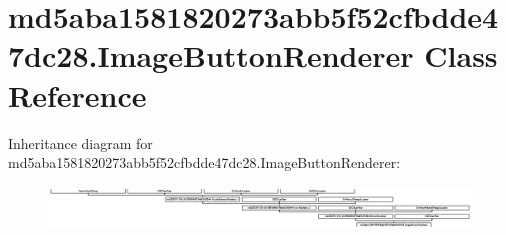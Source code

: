 \hypertarget{classmd5aba1581820273abb5f52cfbdde47dc28_1_1ImageButtonRenderer}{}\section{md5aba1581820273abb5f52cfbdde47dc28.\+Image\+Button\+Renderer Class Reference}
\label{classmd5aba1581820273abb5f52cfbdde47dc28_1_1ImageButtonRenderer}
Inheritance diagram for md5aba1581820273abb5f52cfbdde47dc28.\+Image\+Button\+Renderer\+:\begin{figure}[H]
\begin{center}
\leavevmode
\includegraphics[height=1.143791cm]{classmd5aba1581820273abb5f52cfbdde47dc28_1_1ImageButtonRenderer}
\end{center}
\end{figure}
